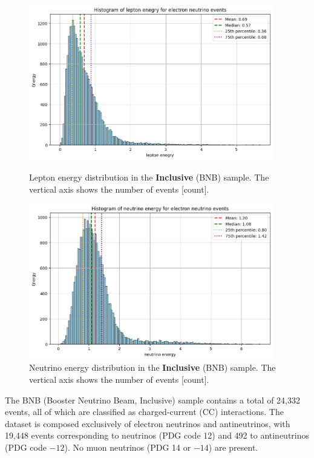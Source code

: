 \documentclass{pracalicmgr}
\begin{document}
\begin{figure}[H]
    \centering
    \begin{minipage}[t]{0.6\textwidth}
        \centering
        \includegraphics[width=0.95\textwidth]{src/leptonElectron.png}
        \caption{Lepton energy distribution in the \textbf{Inclusive} (BNB) sample. The vertical axis shows the number of events [count].}
        \label{fig:lepton-inclusive}
    \end{minipage}
    \hfill
    \begin{minipage}[t]{0.6\textwidth}
    \centering
    \includegraphics[width=0.95\textwidth]{src/neutrinoElectron.png}
    \caption{Neutrino energy distribution in the \textbf{Inclusive} (BNB) sample. The vertical axis shows the number of events [count].}
    \label{fig:neutrino-inclusive}
    \end{minipage}
\end{figure}

The BNB (Booster Neutrino Beam, Inclusive) sample contains a total of 24,332 events, all of which are classified as charged-current (CC) interactions. The dataset is composed exclusively of electron neutrinos and antineutrinos, with 19,448 events corresponding to neutrinos (PDG code 12) and 492 to antineutrinos (PDG code $-12$). No muon neutrinos (PDG 14 or $-14$) are present.
\end{document}

